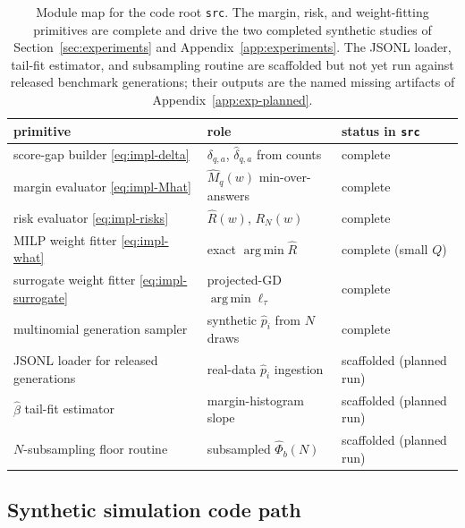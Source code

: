 \documentclass{article} %
\providecommand{\argmin}{\mathop{\mathrm{arg\,min}}\limits}
\providecommand{\Risk}{R}
\providecommand{\eRisk}{\widehat{R}}
\providecommand{\dhat}{\widehat{\delta}}
\providecommand{\phat}{\widehat{p}}
\providecommand{\Mhat}{\widehat{M}}
\begin{document}
\begin{table}[t]
\centering
\small
\begin{tabular}{lll}
\toprule
primitive & role & status in \texttt{src} \\
\midrule
score-gap builder \eqref{eq:impl-delta}      & $\delta_{q,a}$, $\dhat_{q,a}$ from counts & complete \\
margin evaluator \eqref{eq:impl-Mhat}         & $\Mhat_q(w)$ min-over-answers            & complete \\
risk evaluator \eqref{eq:impl-risks}          & $\eRisk(w)$, $\Risk_N(w)$                & complete \\
MILP weight fitter \eqref{eq:impl-what}       & exact $\argmin\eRisk$                    & complete (small $Q$) \\
surrogate weight fitter \eqref{eq:impl-surrogate} & projected-GD $\argmin\ell_\tau$      & complete \\
multinomial generation sampler                & synthetic $\phat_i$ from $N$ draws       & complete \\
JSONL loader for released generations         & real-data $\phat_i$ ingestion            & scaffolded (planned run) \\
$\widehat\beta$ tail-fit estimator            & margin-histogram slope                   & scaffolded (planned run) \\
$N$-subsampling floor routine                 & subsampled $\widehat\Phi_b(N)$           & scaffolded (planned run) \\
\bottomrule
\end{tabular}
\caption{Module map for the code root \texttt{src}.  The margin, risk, and
weight-fitting primitives are complete and drive the two completed synthetic
studies of Section~\ref{sec:experiments} and Appendix~\ref{app:experiments}.
The JSONL loader, tail-fit estimator, and subsampling routine are scaffolded
but not yet run against released benchmark generations; their outputs are the
named missing artifacts of Appendix~\ref{app:exp-planned}.}
\label{tab:impl-modules}
\end{table}

\subsection{Synthetic simulation code path}
\label{app:impl-synth}
\end{document}
